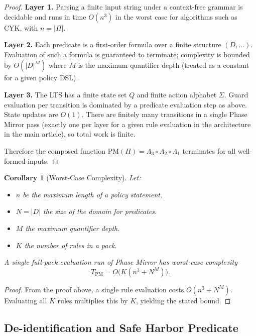 \documentclass[12pt,letterpaper]{article}
\theoremstyle{definition}
\theoremstyle{plain}
\newtheorem{corollary}[theorem]{Corollary}
\theoremstyle{remark}
\begin{document}
\begin{proof}
\textbf{Layer 1.} Parsing a finite input string under a context-free grammar is decidable and runs in time \(O(n^3)\) in the worst case for algorithms such as CYK, with \(n = |\Pi|\).

\textbf{Layer 2.} Each predicate is a first-order formula over a finite structure \((D, \ldots)\). Evaluation of such a formula is guaranteed to terminate; complexity is bounded by \(O(|D|^M)\) where \(M\) is the maximum quantifier depth (treated as a constant for a given policy DSL).

\textbf{Layer 3.} The LTS has a finite state set \(Q\) and finite action alphabet \(\Sigma\). Guard evaluation per transition is dominated by a predicate evaluation step as above. State updates are \(O(1)\). There are finitely many transitions in a single Phase Mirror pass (exactly one per layer for a given rule evaluation in the architecture in the main article), so total work is finite.

Therefore the composed function \(\mathrm{PM}(\Pi) = \Lambda_3 \circ \Lambda_2 \circ \Lambda_1\) terminates for all well-formed inputs.
\end{proof}

\begin{corollary}[Worst-Case Complexity]
Let:
\begin{itemize}
  \item \(n\) be the maximum length of a policy statement.
  \item \(N = |D|\) the size of the domain for predicates.
  \item \(M\) the maximum quantifier depth.
  \item \(K\) the number of rules in a pack.
\end{itemize}
A single full-pack evaluation run of Phase Mirror has worst-case complexity
\[
T_{\mathrm{PM}} = O\big(K (n^3 + N^M)\big).
\]
\end{corollary}

\begin{proof}
From the proof above, a single rule evaluation costs \(O(n^3 + N^M)\). Evaluating all \(K\) rules multiplies this by \(K\), yielding the stated bound.
\end{proof}

\subsection{De-identification and Safe Harbor Predicate}
\label{subsec:deid}
\end{document}
